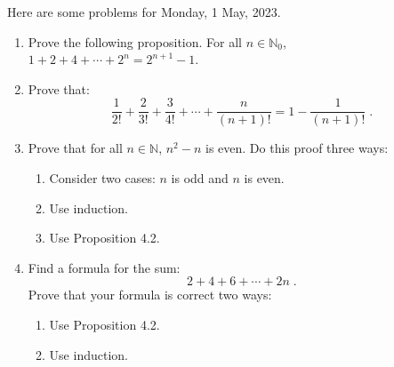 \documentclass[12pt]{article} %
\begin{document}
Here are some problems for Monday, 1 May, 2023.
\bigskip

\begin{enumerate}
\setlength{\itemsep}{9mm} %

    \item Prove the following proposition. For all $n \in \mathbb{N}_0$, $1+2+4+ \cdots + 2^n = 2^{n+1} - 1$.

    \item Prove that:
    \begin{equation}
      \frac{1}{2!} + \frac{2}{3!} + \frac{3}{4!} + \cdots +
      \frac{n}{(n+1)!} = 1 - \frac{1}{(n+1)!} \;. 
\end{equation}
      \item Prove that for all $n \in \mathbb{N}$, $n^2 - n$ is even. Do this proof three ways:
      \begin{enumerate}
          \item Consider two cases: $n$ is odd and $n$ is even.
          \item Use induction.
          \item Use Proposition 4.2.
      \end{enumerate}

      \item Find a formula for the sum:
      \begin{equation}
          2 + 4 + 6 + \cdots + 2n \;.
      \end{equation}
      Prove that your formula is correct two ways:
      \begin{enumerate}
      \item Use Proposition 4.2.
      \item Use induction.
      \end{enumerate}

\end{enumerate}
\end{document}
